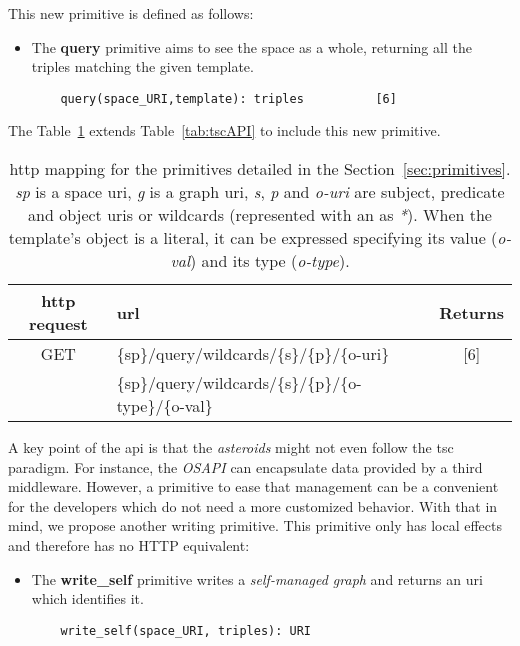 This new primitive is defined as follows:
\begin{itemize}
  \item The \textbf{query} primitive aims to see the space as a whole, returning all the triples matching the given template.
  
  \begin{lstlisting}
    query(space_URI,template): triples          [6]
  \end{lstlisting}
\end{itemize}


The Table~\ref{tab:queryAPI} extends Table~\ref{tab:tscAPI} to include this new primitive.

\begin{table} %
  \centering
  \caption {
    \acs{http} mapping for the primitives detailed in the Section~\ref{sec:primitives}. \textit{sp} is a space \acs{uri},
    \textit{g} is a graph \acs{uri}, \textit{s}, \textit{p} and \textit{o-uri} are subject, predicate and object \acsp{uri} or wildcards (represented with an as \textit{*}).
    When the template's object is a literal, it can be expressed specifying its value (\textit{o-val}) and its type (\textit{o-type}).
    \medskip
  }
  \begin{tabular}{c|l|c}
      \acs{http} request & \acs{url} & Returns \\
      \hline
      GET & \{sp\}/query/wildcards/\{s\}/\{p\}/\{o-uri\} &  [6] \\
      & \{sp\}/query/wildcards/\{s\}/\{p\}/\{o-type\}/\{o-val\} & \\
  \end{tabular}
  \label{tab:queryAPI}
\end{table}


A key point of the \ac{api} is that the \emph{asteroids} might not even follow the \ac{tsc} paradigm.
For instance, the \emph{OSAPI} can encapsulate data provided by a third middleware.
However, a primitive to ease that management can be a convenient for the developers which do not need a more customized behavior.
With that in mind, we propose another writing primitive.
This primitive only has local effects and therefore has no HTTP equivalent:
\begin{itemize}
  \item The \textbf{write\_self} primitive writes a \emph{self-managed graph} and returns an \ac{uri} which identifies it.
  
  \begin{lstlisting}
    write_self(space_URI, triples): URI
  \end{lstlisting}
\end{itemize}



